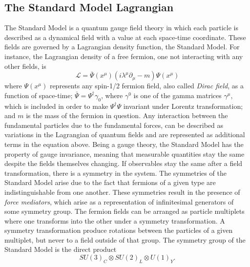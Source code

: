 \subsection{The Standard Model Lagrangian}
\label{sec:theory:gauge}
The Standard Model is a quantum gauge field theory in which each particle is described as a dynamical field with a value at each space-time coordinate. These fields are governed by a Lagrangian density function, the Standard Model. For instance, the Lagrangian density of a free fermion, one not interacting with any other fields, is
\begin{equation}
  \mathcal{L} = \bar{\Psi}(x^{\mu})(i\lambda^{\mu}\partial_{\mu}-m)\Psi(x^{\mu})
\end{equation}
where $\Psi(x^{\mu})$ represents any spin-1/2 fermion field, also called \emph{Dirac field}, as a function of space-time; $\bar{\Psi}=\Psi^{\dagger}\gamma_0$, where $\gamma^0$ is one of the gamma matrices $\gamma^{\mu}$, which is included in order to make $\Psi^{\dagger}\Psi$ invariant under Lorentz transformation; and $m$ is the mass of the fermion in question. Any interaction between the fundamental particles due to the fundamental forces, can be described as variations in the Lagrangian of quantum fields and are represented as additional terms in the equation above.\newline
Being a gauge theory, the Standard Model has the property of gauge invariance, meaning that measurable quantities stay the same despite the fields themselves changing. If observables stay the same after a field transformation, there is a symmetry in the system. The symmetries of the Standard Model arise due to the fact that fermions of a given type are indistinguishable from one another. These symmetries result in the presence of \emph{force mediators}, which arise as a representation of infinitesimal generators of some symmetry group.
The fermion fields can be arranged as particle multiplets where one transforms into the other under a symmetry transformation. A symmetry transformation produce rotations between the particles of a given multiplet, but never to a field outside of that group. The symmetry group of the Standard Model is the direct product
\begin{equation}
  SU(3)_C \otimes SU (2)_L \otimes U(1)_Y.
\end{equation}
